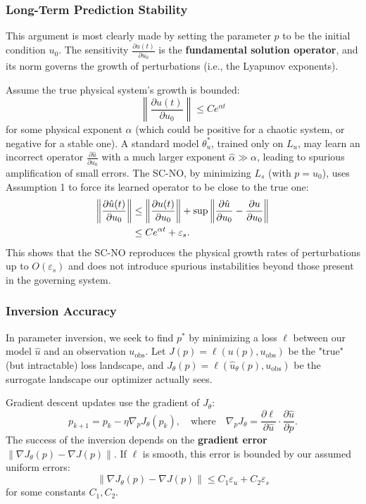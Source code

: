 \subsubsection*{Long-Term Prediction Stability}

This argument is most clearly made by setting the parameter $p$ to be the initial condition $u_0$. The sensitivity $\frac{\partial u(t)}{\partial u_0}$ is the \textbf{fundamental solution operator}, and its norm governs the growth of perturbations (i.e., the Lyapunov exponents).

Assume the true physical system's growth is bounded:
\begin{equation}
\left\| \frac{\partial u(t)}{\partial u_0} \right\| \le C e^{\alpha t}
\end{equation}
for some physical exponent $\alpha$ (which could be positive for a chaotic system, or negative for a stable one). A standard model $\theta_u^*$, trained only on $L_u$, may learn an incorrect operator $\frac{\partial \hat{u}}{\partial u_0}$ with a much larger exponent $\hat{\alpha} \gg \alpha$, leading to spurious amplification of small errors. The SC-NO, by minimizing $L_s$ (with $p=u_0$), uses Assumption 1 to force its learned operator to be close to the true one:
\begin{align}
\left\| \frac{\partial \hat{u}(t)}{\partial u_0} \right\| &\le \left\| \frac{\partial u(t)}{\partial u_0} \right\| + \sup \left\| \frac{\partial \hat{u}}{\partial u_0} - \frac{\partial u}{\partial u_0} \right\| \notag \\
&\le C e^{\alpha t} + \varepsilon_s.
\end{align}
This shows that the SC-NO reproduces the physical growth rates of perturbations up to $O(\varepsilon_s)$ and does not introduce spurious instabilities beyond those present in the governing system.


\subsubsection*{Inversion Accuracy}

In parameter inversion, we seek to find $p^*$ by minimizing a loss $\ell$ between our model $\hat{u}$ and an observation $u_{\text{obs}}$. Let $J(p) = \ell(u(p), u_{\text{obs}})$ be the "true" (but intractable) loss landscape, and $J_\theta(p) = \ell(\hat{u}_\theta(p), u_{\text{obs}})$ be the surrogate landscape our optimizer actually sees.

Gradient descent updates use the gradient of $J_\theta$:
\begin{equation}
p_{k+1} = p_k - \eta \nabla_p J_\theta(p_k), \quad \text{where} \quad \nabla_p J_\theta = \frac{\partial \ell}{\partial \hat{u}} \cdot \frac{\partial \hat{u}}{\partial p}.
\end{equation}
The success of the inversion depends on the \textbf{gradient error} $\|\nabla J_\theta(p) - \nabla J(p)\|$. If $\ell$ is smooth, this error is bounded by our assumed uniform errors:
\begin{equation}
\|\nabla J_\theta(p) - \nabla J(p)\| \le C_1 \varepsilon_u + C_2 \varepsilon_s
\end{equation}
for some constants $C_1, C_2$.

